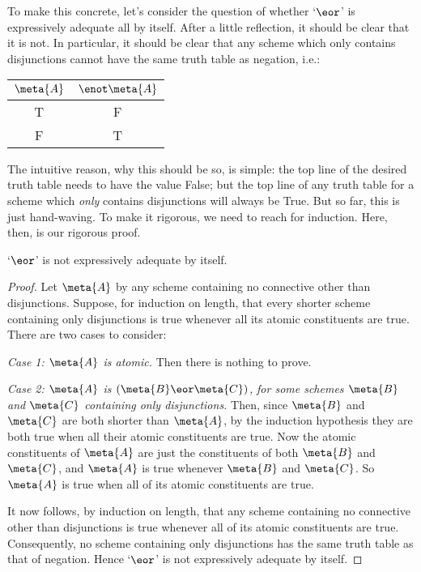  To make this concrete, let's consider the question of whether `$\eor$' is expressively adequate all by itself. After a little reflection, it should be clear that it is not. In particular, it should be clear that any scheme which only contains disjunctions cannot have the same truth table as negation, i.e.:
				\begin{center}
				\begin{tabular}{c | c}
				$\meta{A}$ & $\enot \meta{A}$\\
				\hline
				 T &  F \\
				 F & T
				\end{tabular}
				\end{center}
The intuitive reason, why this should be so, is simple: the top line of the desired truth table needs to have the value False; but the top line of any truth table for a scheme which \emph{only} contains disjunctions will always be True. But so far, this is just hand-waving. To make it rigorous, we need to reach for induction. Here, then, is our rigorous proof.
 	\begin{prop}\label{prop:OrNotAdequate}
		`$\eor$' is not expressively adequate by itself.
		\begin{proof}
			Let $\meta{A}$ by any scheme containing no connective other than disjunctions. Suppose, for induction on length, that every shorter scheme containing only disjunctions is true whenever all its atomic constituents are true. There are two cases to consider:
				\begin{ebullet}
					\item[\emph{Case 1: $\meta{A}$ is atomic.}] Then there is nothing to prove.
					\item[\emph{Case 2: $\meta{A}$ is $(\meta{B} \eor \meta{C})$,}]\emph{for some schemes $\meta{B}$ and $\meta{C}$ containing only disjunctions.} Then, since $\meta{B}$ and $\meta{C}$ are both shorter than $\meta{A}$, by the induction hypothesis they are both true when all their atomic constituents are true. Now the atomic constituents of $\meta{A}$ are just the constituents of both $\meta{B}$ and $\meta{C}$, and $\meta{A}$ is true whenever $\meta{B}$ and $\meta{C}$. So $\meta{A}$ is true when all of its atomic constituents are true.
				\end{ebullet}
			It now follows, by induction on length, that any scheme containing no connective other than disjunctions is true whenever all of its atomic constituents are true. Consequently, no scheme containing only disjunctions has the same truth table as that of negation. Hence `$\eor$' is not expressively adequate by itself.
		\end{proof}
	\end{prop}\noindent
